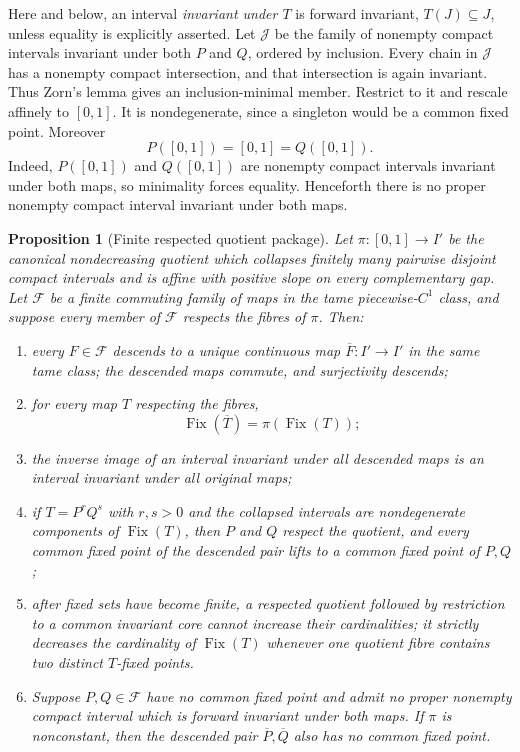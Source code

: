 \documentclass[11pt]{article}
\newtheorem{proposition}[theorem]{Proposition}
\theoremstyle{definition}
\theoremstyle{remark}
\newcommand{\I}{[0,1]}
\newcommand{\Fix}{\operatorname{Fix}}
\begin{document}
Here and below, an interval \emph{invariant under \(T\)} is forward
invariant, \(T(J)\subseteq J\), unless equality is explicitly asserted.  Let
$\mathscr J$ be the family of nonempty compact intervals invariant under
both $P$ and $Q$, ordered by inclusion.  Every chain in $\mathscr J$ has a
nonempty compact intersection, and that intersection is again invariant.
Thus Zorn's lemma gives an inclusion-minimal member.  Restrict to it and
rescale affinely to $\I$.  It is nondegenerate, since a singleton would be a
common fixed point.  Moreover
\begin{equation}\label{eq:onto}
 P(\I)=\I=Q(\I).
\end{equation}
Indeed, $P(\I)$ and $Q(\I)$ are nonempty compact intervals invariant under
both maps, so minimality forces equality.  Henceforth there is no proper
nonempty compact interval invariant under both maps.

\begin{proposition}[Finite respected quotient package]
\label{prop:quotient-package}
Let $\pi:\I\to I'$ be the canonical nondecreasing quotient which collapses
finitely many pairwise disjoint compact intervals and is affine with positive
slope on every complementary gap.  Let $\mathscr F$ be a finite commuting
family of maps in the tame piecewise-$C^1$ class, and suppose every member of
$\mathscr F$ respects the fibres of $\pi$.  Then:
\begin{enumerate}
\item every $F\in\mathscr F$ descends to a unique continuous map
$\overline F:I'\to I'$ in the same tame class; the descended maps commute,
and surjectivity descends;
\item for every map $T$ respecting the fibres,
\begin{equation}\label{eq:fix-quotient-analytic}
 \Fix(\overline T)=\pi(\Fix(T));
\end{equation}
\item the inverse image of an interval invariant under all descended maps is
an interval invariant under all original maps;
\item if $T=P^rQ^s$ with $r,s>0$ and the collapsed intervals are
nondegenerate components of $\Fix(T)$, then $P$ and $Q$ respect the quotient,
and every common fixed point of the descended pair lifts to a common fixed
point of $P,Q$;
\item after fixed sets have become finite, a respected quotient followed by
restriction to a common invariant core cannot increase their cardinalities;
it strictly decreases the cardinality of $\Fix(T)$ whenever one quotient
fibre contains two distinct $T$-fixed points.
\item Suppose $P,Q\in\mathscr F$ have no common fixed point and admit no
proper nonempty compact interval which is forward invariant under both maps.
If $\pi$ is nonconstant, then the descended pair
$\overline P,\overline Q$ also has no common fixed point.
\end{enumerate}
\end{proposition}
\end{document}
